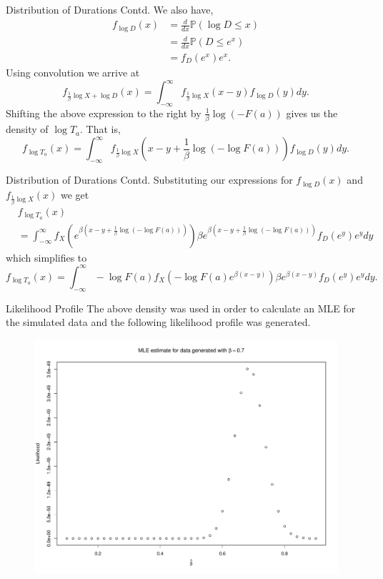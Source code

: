 \documentclass{beamer}
\newcommand{\Prob}{\mathbb{P}}
\begin{document}
\begin{frame}{Distribution of Durations Contd.}
    We also have,
    \begin{align*}
    f_{\log D}(x)&= \frac{d}{dx}\Prob(\log D\leq x)\\
                 &= \frac{d}{dx}\Prob(D\leq e^x)\\
                 &= f_D(e^x)e^x.
    \end{align*}
    Using convolution we arrive at
    \[
    f_{\frac{1}{\beta}\log X+\log D}(x)= \int^\infty_{-\infty} f_{\frac{1}{\beta}\log X}(x-y)f_{\log D}(y)dy.
    \]
    Shifting the above expression to the right by $\frac{1}{\beta}\log(-F(a))$ gives us the density of $\log T_a$. That is,
    \[
        f_{\log T_a}(x)=\int^\infty_{-\infty} f_{\frac{1}{\beta}\log X}\left(x-y+\frac{1}{\beta}\log(-\log F(a))\right)f_{\log D}(y)dy.
    \]
\end{frame}

\begin{frame}{Distribution of Durations Contd.}
    Substituting our expressions for $f_{\log D}(x)$ and $f_{\frac{1}{\beta}\log X}(x)$ we get
    \begin{align*}
        &f_{\log T_a}(x)\\
        &=\int^\infty_{-\infty} f_X(e^{ \beta(x-y+\frac{1}{\beta}\log(-\log F(a)))})
        \beta e^{ \beta(x-y+\frac{1}{\beta}\log(-\log F(a)))}f_D(e^y)e^y dy
    \end{align*}
    which simplifies to
    \[
        f_{\log T_a}(x)=\int^\infty_{-\infty} - \log F(a) f_X(-\log F(a)e^{\beta(x-y)})\beta e^{\beta(x-y)} f_D(e^y)e^y dy.
    \]
\end{frame}

\begin{frame}{Likelihood Profile}
    The above density was used in order to calculate an MLE for the simulated data and the following likelihood profile was generated.
    \begin{figure}
        \centering
        \includegraphics[scale=0.33]{LikelihoodProfile.pdf}
    \end{figure}
\end{frame}
\end{document}
